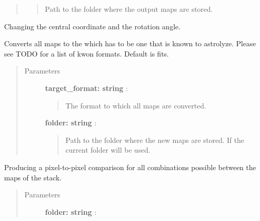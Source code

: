 \documentclass[a4paper,10pt,english]{sphinxmanual}
\begin{document}
\begin{fulllineitems}
\begin{fulllineitems}
\begin{quote}
\begin{description}
\begin{quote}
Path to the folder where the output maps are stored.
\end{quote}

\end{description}\end{quote}

\end{fulllineitems}


\begin{fulllineitems}
\label{maps:astrolyze.maps.stack.Stack.unify_projections}
Changing the central coordinate and the rotation angle.

\end{fulllineitems}


\begin{fulllineitems}
\label{maps:astrolyze.maps.stack.Stack.unify_formats}
Converts all maps to the  which has to be one
that is known to astrolyze. Please see TODO for a list of kwon formats.
Default is fits.
\begin{quote}\begin{description}
\item[{Parameters }] \leavevmode
\textbf{target\_format: string} :
\begin{quote}

The format to which all maps are converted.
\end{quote}

\textbf{folder: string} :
\begin{quote}

Path to the folder where the new maps are stored.
If  the current folder will be used.
\end{quote}

\end{description}\end{quote}

\end{fulllineitems}


\begin{fulllineitems}
\label{maps:astrolyze.maps.stack.Stack.pixel_pixel_compare}
Producing a pixel-to-pixel comparison for all combinations
possible between the maps of the stack.
\begin{quote}\begin{description}
\item[{Parameters }] \leavevmode
\textbf{folder: string} :
\begin{quote}


\end{quote}
\end{description}
\end{quote}
\end{fulllineitems}
\end{fulllineitems}
\end{document}
